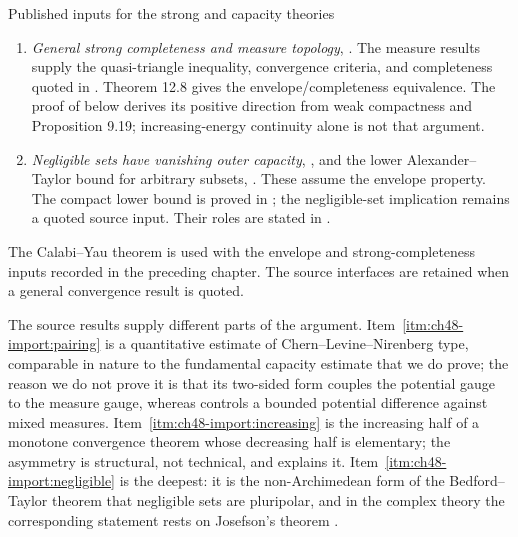 \begin{important}{Published inputs for the strong and capacity theories}
\begin{enumerate}
      , explaining the obstacle-limit
      step of  in
      .
\item\label{itm:ch48-import:completeness}
      \emph{General strong completeness and measure topology},
      \cite[Theorems~10.2, 10.12, 10.14 and~12.8]{BJ22}.
      The measure results supply the quasi-triangle inequality,
      convergence criteria, and completeness quoted in
      . Theorem 12.8 gives the
      envelope/completeness equivalence. The proof of
       below derives its positive direction
      from weak compactness and Proposition 9.19; increasing-energy
      continuity alone is not that argument.
\item\label{itm:ch48-import:negligible}
      \emph{Negligible sets have vanishing outer capacity},
      \cite[Lemma~13.19 and Theorem~13.17]{BJ22}, and the lower
      Alexander--Taylor bound for arbitrary subsets,
      \cite[Theorem~13.14]{BJ22}. These assume the envelope property.
      The compact lower bound is proved in ;
      the negligible-set implication remains a quoted source input.
      Their roles are stated in .
\end{enumerate}
The Calabi--Yau theorem  is used with the
envelope and strong-completeness inputs recorded in the preceding chapter.
The source interfaces are retained when a general convergence result is
quoted.
\end{important}

The source results supply different parts of the argument.  Item~\cref{itm:ch48-import:pairing} is a quantitative estimate of
Chern--Levine--Nirenberg type, comparable in nature to the fundamental
capacity estimate  that we do prove; the reason
we do not prove it is that its two-sided form couples the potential gauge
to the measure gauge, whereas  controls
a bounded potential difference against mixed measures.
Item~\cref{itm:ch48-import:increasing} is the increasing half of a monotone
convergence theorem whose decreasing half is elementary; the asymmetry is
structural, not technical, and  explains
it.  Item~\cref{itm:ch48-import:negligible} is the deepest: it is the
non-Archimedean form of the Bedford--Taylor theorem that negligible sets
are pluripolar, and in the complex theory the corresponding statement rests
on Josefson's theorem \cite{Jos78}.

